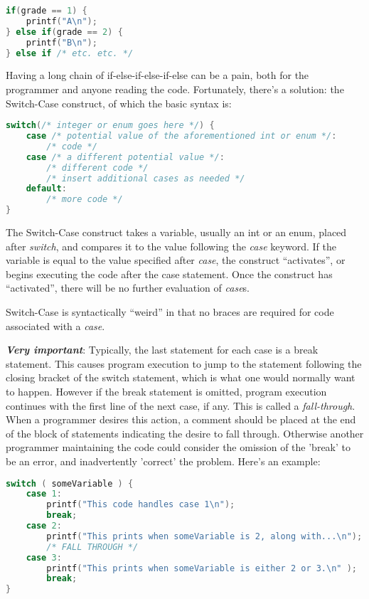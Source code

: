 \lstset{basicstyle=\scriptsize, numbers=left, captionpos=b, tabsize=4}
\begin{lstlisting}[caption=Section \thesection listing \arabic{controlcnt},language={C},
breaklines=true,xleftmargin=15pt, label=lst:section\thesection listing\arabic{controlcnt}]
if(grade == 1) {
	printf("A\n");
} else if(grade == 2) {
	printf("B\n");
} else if /* etc. etc. */
\end{lstlisting}

Having a long chain of if-else-if-else-if-else can be a pain, both for the
programmer and anyone reading the code. Fortunately, there's a solution: the
Switch-Case construct, of which the basic syntax is:
\lstset{basicstyle=\scriptsize, numbers=left, captionpos=b, tabsize=4}
\begin{lstlisting}[caption=Section \thesection listing \arabic{controlcnt},language={C},
breaklines=true,xleftmargin=15pt, label=lst:section\thesection listing\arabic{controlcnt}]
switch(/* integer or enum goes here */) {
	case /* potential value of the aforementioned int or enum */:
		/* code */
	case /* a different potential value */:
		/* different code */
		/* insert additional cases as needed */
	default: 
		/* more code */
}
\end{lstlisting}

The Switch-Case construct takes a variable, usually an int or an enum, placed
after \emph{switch}, and compares it to the value following the \emph{case}
keyword. If the variable is equal to the value specified after \emph{case}, the
construct ``activates'', or begins executing the code after the case statement.
Once the construct has ``activated'', there will be no further evaluation of
\emph{case}s. 

Switch-Case is syntactically ``weird'' in that no braces are required for code
associated with a \emph{case}.

\textbf{\emph{Very important}}: Typically, the last statement for each case is
a break statement. This causes program execution to jump to the statement
following the closing bracket of the switch statement, which is what one would
normally want to happen. However if the break statement is omitted, program
execution continues with the first line of the next case, if any. This is
called a \emph{fall-through}. When a programmer desires this action, a comment
should be placed at the end of the block of statements indicating the desire to
fall through. Otherwise another programmer maintaining the code could consider
the omission of the 'break' to be an error, and inadvertently 'correct' the
problem. Here's an example:
\lstset{basicstyle=\scriptsize, numbers=left, captionpos=b, tabsize=4}
\begin{lstlisting}[caption=Section \thesection listing \arabic{controlcnt},language={C},
breaklines=true,xleftmargin=15pt, label=lst:section\thesection listing\arabic{controlcnt}]
switch ( someVariable ) {
	case 1:
		printf("This code handles case 1\n");
		break;
	case 2:
		printf("This prints when someVariable is 2, along with...\n");
		/* FALL THROUGH */
	case 3:
		printf("This prints when someVariable is either 2 or 3.\n" );
		break;
}
\end{lstlisting}

